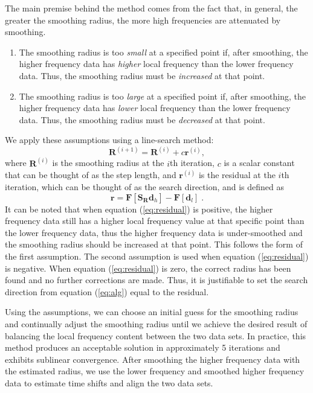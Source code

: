        The main premise behind the method comes from the fact that, in general, the greater the smoothing radius, the more high frequencies are attenuated by smoothing. 
        \begin{enumerate}
        \item The smoothing radius is too \emph{small} at a specified point if, after smoothing, the higher frequency data has \emph{higher} local frequency than the lower frequency data. Thus, the smoothing radius must be \emph{increased} at that point. 
        \item The smoothing radius is too \emph{large} at a specified point if, after smoothing, the higher frequency data has \emph{lower} local frequency than the lower frequency data. Thus, the smoothing radius must be \emph{decreased} at that point.
        \end{enumerate}
        We apply these assumptions using a line-search method:
                        \begin{equation}
                               \label{eq:alg}
                               \mathbf{R}^{(i+1)} = \mathbf{R}^{(i)}+ c \mathbf{r}^{(i)},
                        \end{equation}
        where $\mathbf{R}^{(i)}$ is the smoothing radius at the $i$th iteration, $c$ is a scalar constant that can be thought of as the step length, and $\mathbf{r}^{(i)}$ is the residual at the $i$th iteration, which can be thought of as the search direction, and is defined as
          \begin{equation}
                \label{eq:residual}
                \mathbf{r} = \mathbf{F}[\mathbf{S}_{\mathbf{R}} \mathbf{d}_h] - \mathbf{F}[\mathbf{d}_l]\;.
          \end{equation}
        It can be noted that when equation (\ref{eq:residual}) is positive, the higher frequency data still has a higher local frequency value at that specific point than the lower frequency data, thus the higher frequency data is under-smoothed and the smoothing radius should be increased at that point. This follows the form of the first assumption. 
        The second assumption is used when equation (\ref{eq:residual}) is negative. 
        When equation (\ref{eq:residual}) is zero, the correct radius has been found and no further corrections are made. 
        Thus, it is justifiable to set the search direction from equation (\ref{eq:alg}) equal to the residual.
        
        Using the assumptions, we can choose an initial guess for the smoothing radius and continually adjust the smoothing radius until we  achieve the desired result of balancing the local frequency content between the two data sets. 
        In practice, this method produces an acceptable solution in approximately 5 iterations and exhibits sublinear convergence. After smoothing the higher frequency data with the estimated radius, we use the lower frequency and smoothed higher frequency data to estimate time shifts and align the two data sets.
        
